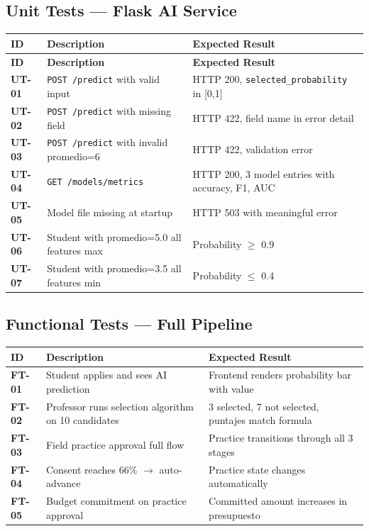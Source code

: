\documentclass[12pt,a4paper]{article}
\newcommand{\ep}[1]{\texttt{\color{grisusco}#1}}
\begin{document}
\subsection{Unit Tests — Flask AI Service}
\begin{longtable}{>{\bfseries}p{1.3cm} p{5cm} p{6cm}}
  \toprule
  \textbf{ID} & \textbf{Description} & \textbf{Expected Result} \\
  \midrule
  \endfirsthead \toprule \textbf{ID} & \textbf{Description} & \textbf{Expected Result} \\ \midrule \endhead
  UT-01 & \ep{POST /predict} with valid input & HTTP 200, \texttt{selected\_probability} in [0,1] \\
  UT-02 & \ep{POST /predict} with missing field & HTTP 422, field name in error detail \\
  UT-03 & \ep{POST /predict} with invalid promedio=6 & HTTP 422, validation error \\
  UT-04 & \ep{GET /models/metrics} & HTTP 200, 3 model entries with accuracy, F1, AUC \\
  UT-05 & Model file missing at startup & HTTP 503 with meaningful error \\
  UT-06 & Student with promedio=5.0 all features max & Probability $\geq$ 0.9 \\
  UT-07 & Student with promedio=3.5 all features min & Probability $\leq$ 0.4 \\
  \bottomrule
\end{longtable}

\subsection{Functional Tests — Full Pipeline}
\begin{longtable}{>{\bfseries}p{1.3cm} p{5cm} p{6cm}}
  \toprule
  \textbf{ID} & \textbf{Description} & \textbf{Expected Result} \\
  \midrule
  FT-01 & Student applies and sees AI prediction & Frontend renders probability bar with value \\
  FT-02 & Professor runs selection algorithm on 10 candidates & 3 selected, 7 not selected, puntajes match formula \\
  FT-03 & Field practice approval full flow & Practice transitions through all 3 stages \\
  FT-04 & Consent reaches 66\% $\to$ auto-advance & Practice state changes automatically \\
  FT-05 & Budget commitment on practice approval & Committed amount increases in presupuesto \\
  \bottomrule
\end{longtable}
\end{document}

